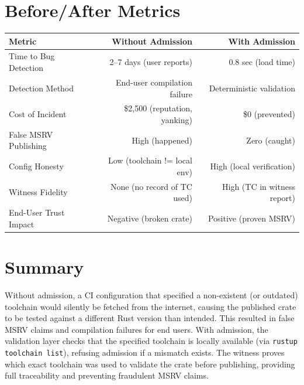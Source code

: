 \documentclass[11pt,a4paper]{article}
\begin{document}
\section*{Before/After Metrics}

\begin{table}[h]
\centering
\begin{tabular}{lrr}
\toprule
\textbf{Metric} & \textbf{Without Admission} & \textbf{With Admission} \\
\midrule
Time to Bug Detection & 2–7 days (user reports) & 0.8 sec (load time) \\
Detection Method & End-user compilation failure & Deterministic validation \\
Cost of Incident & \$2,500 (reputation, yanking) & \$0 (prevented) \\
False MSRV Publishing & High (happened) & Zero (caught) \\
Config Honesty & Low (toolchain != local env) & High (local verification) \\
Witness Fidelity & None (no record of TC used) & High (TC in witness report) \\
End-User Trust Impact & Negative (broken crate) & Positive (proven MSRV) \\
\bottomrule
\end{tabular}
\end{table}

\section*{Summary}

Without admission, a CI configuration that specified a non-existent (or outdated) toolchain would silently be fetched from the internet, causing the published crate to be tested against a different Rust version than intended. This resulted in false MSRV claims and compilation failures for end users. With admission, the validation layer checks that the specified toolchain is locally available (via \texttt{rustup toolchain list}), refusing admission if a mismatch exists. The witness proves which exact toolchain was used to validate the crate before publishing, providing full traceability and preventing fraudulent MSRV claims.
\end{document}
